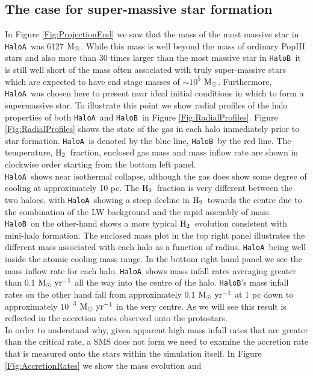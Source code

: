 \documentclass[graphics, twocolumn, usenatbib]{mn2e}
\newcommand{\msolarc} {$\rm{M_{\odot}}$}
\newcommand{\msolaryr} {$\rm{M_{\odot}~yr^{-1}}~$}
\newcommand{\molH} {$\rm{H_2}$~}
\newcommand{\ha} {\texttt{HaloA~}}
\newcommand{\hb} {\texttt{HaloB~}}
\newcommand{\hbc} {\texttt{HaloB}}
\begin{document}
\subsection{The case for super-massive star formation}
In Figure \ref{Fig:ProjectionEnd} we saw that the mass of the most massive star in \ha was
6127 \msolarc. While this mass is well beyond the mass of ordinary PopIII stars \citep{Turk_2009, Greif_2011, Wise_2012b, Crosby_2013, Susa_2014, Hirano_2014, Stacy_2016} and also more than 30 times
larger than the most massive star in \hb it is still well short of the mass often associated with
truly super-massive stars \citep[e.g.][]{Woods_2018} which are expected to have
end stage masses of $\sim 10^5$ \msolarc. Furthermore, \ha was chosen here to present near ideal
initial conditions in which to form a supermassive star.
To illustrate this point we show radial profiles of the halo properties of both \ha and \hb in
Figure \ref{Fig:RadialProfiles}. Figure \ref{Fig:RadialProfiles} shows the state of the gas in each halo immediately prior to star formation. \ha is denoted by the blue line, \hb by the red line.
The temperature, \molH fraction, enclosed gas mass and mass inflow rate are shown in clockwise order starting from the bottom left panel. \\
\indent \ha shows near isothermal collapse, although the gas does
show some degree of cooling at approximately 10 pc. The \molH fraction is very different between
the two haloes, with \ha showing a steep decline in \molH towards the centre due to the combination
of the LW background and the rapid assembly of mass. \hb on the other-hand shows a more typical
\molH evolution consistent with mini-halo formation. The enclosed mass plot in the top right panel
illustrates the different mass associated with each halo as a function of radius. \ha being well
inside the atomic cooling mass range. In the bottom right hand panel we see the mass inflow rate for
each halo. \ha shows mass infall rates averaging greater than 0.1 \msolaryr all the way into the
centre of the halo. \hbc's mass infall rates on the other hand fall from approximately
0.1 \msolaryr at 1 pc down to approximately $10^{-3}$ \msolaryr in the very centre. As we will see
this result is reflected in the accretion rates observed onto the protostars. \\
\indent In order to understand why, given apparent high mass infall rates that are greater than the
critical rate, a SMS does not form we need to examine the accretion rate that is measured onto the
stars within the simulation itself. In Figure \ref{Fig:AccretionRates} we show the mass evolution and
\end{document}
